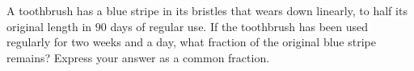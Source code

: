 A toothbrush has a blue stripe in its bristles that wears down linearly, to half its original length in $90$ days of regular use. If the toothbrush has been used regularly for two weeks and a day, what fraction of the original blue stripe remains? Express your answer as a common fraction.

